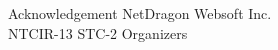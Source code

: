 \documentclass[final,hyperref={pdfpagelabels=false}]{beamer}
\begin{document}
\begin{frame}{}
\begin{columns}[t]
\begin{column}{.49\linewidth}
        \begin{block}{Acknowledgement}
          NetDragon Websoft Inc. \\
          NTCIR-13 STC-2 Organizers
        \end{block}

      \end{column}
    \end{columns}
  \end{frame}
\end{document}
